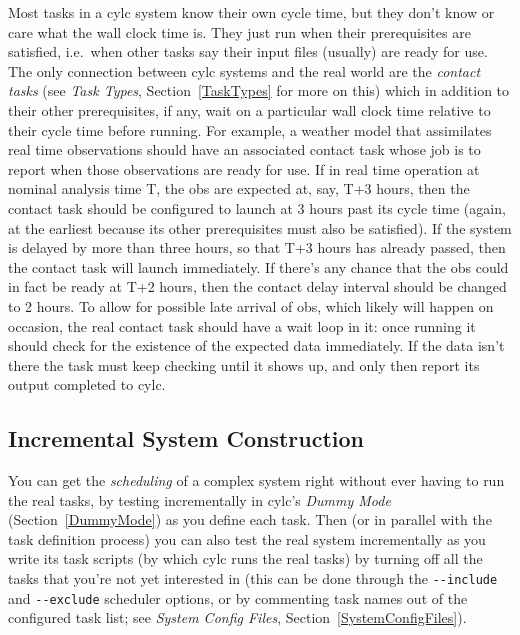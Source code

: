 \documentclass[11pt,a4paper]{article}
\begin{document}
Most tasks in a cylc system know their own cycle time, but they don't
know or care what the wall clock time is.  They just run when their
prerequisites are satisfied, i.e.\  when other tasks say their input
files (usually) are ready for use. The only connection between cylc
systems and the real world are the {\em contact tasks} (see {\em Task
Types}, Section~\ref{TaskTypes} for more on this) which in addition to
their other prerequisites, if any, wait on a particular wall clock time
relative to their cycle time before running.  For example, a weather
model that assimilates real time observations should have an associated
contact task whose job is to report when those observations are ready
for use.  If in real time operation at nominal analysis time T, the obs
are expected at, say, T+3 hours, then the contact task should be
configured to launch at 3 hours past its cycle time (again, at the
earliest because its other prerequisites must also be satisfied).
If the system is delayed by more than three hours, so that T+3 hours 
has already passed, then the contact task will launch immediately.
If there's any chance that the obs could in fact be ready at T+2 hours,
then the contact delay interval should be changed to 2 hours.  To allow
for possible late arrival of obs, which likely will happen on occasion,
the real contact task should have a wait loop in it: once running it
should check for the existence of the expected data immediately. If the
data isn't there the task must keep checking until it shows up, and only then
report its output completed to cylc. 


\subsection{Incremental System Construction} 
\label{IncrementalSystemConstruction}

You can get the {\em scheduling} of a complex system right without ever
having to run the real tasks, by testing incrementally in cylc's {\em
Dummy Mode} (Section~\ref{DummyMode}) as you define each task. Then (or
in parallel with the task definition process) you can also test the real
system incrementally as you write its task scripts (by which cylc runs
the real tasks) by turning off all the tasks that you're not yet
interested in (this can be done through the \lstinline=--include= and
\lstinline=--exclude= scheduler options, or by commenting task names out
of the configured task list; see {\em System Config Files},
Section~\ref{SystemConfigFiles}).
\end{document}
